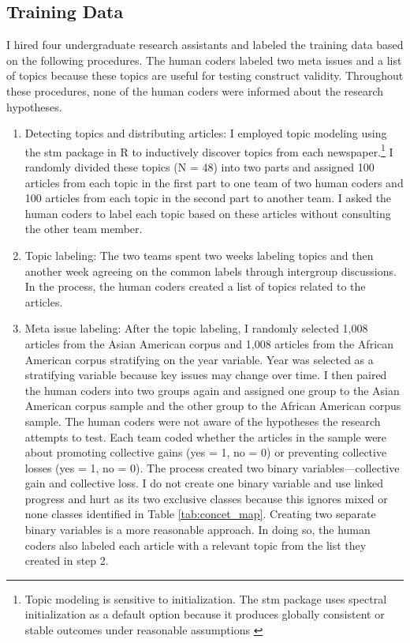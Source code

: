 \documentclass[12 pt]{article}
\begin{document}
\subsection{Training Data}
I hired four undergraduate research assistants and labeled the training data based on the following procedures. The human coders labeled two meta issues and a list of topics because these topics are useful for testing construct validity. Throughout these procedures, none of the human coders were informed about the research hypotheses.

\begin{enumerate}
    \item Detecting topics and distributing articles: I employed topic modeling using the stm package in R \parencite{roberts2014structural} to inductively discover topics from each newspaper.\footnote{Topic modeling is sensitive to initialization. The stm package uses spectral initialization as a default option because it produces globally consistent or stable outcomes under reasonable assumptions \citep[10]{roberts2014structural}} I randomly divided these topics (N = 48) into two parts and assigned 100 articles from each topic in the first part to one team of two human coders and 100 articles from each topic in the second part to another team. I asked the human coders to label each topic based on these articles without consulting the other team member. 
    \item Topic labeling: The two teams spent two weeks labeling topics and then another week agreeing on the common labels through intergroup discussions. In the process, the human coders created a list of topics related to the articles. 
    \item Meta issue labeling: After the topic labeling, I randomly selected 1,008 articles from the Asian American corpus and 1,008 articles from the African American corpus stratifying on the year variable. Year was selected as a stratifying variable because key issues may change over time. I then paired the human coders into two groups again and assigned one group to the Asian American corpus sample and the other group to the African American corpus sample. The human coders were not aware of the hypotheses the research attempts to test. Each team coded whether the articles in the sample were about promoting collective gains (yes = 1, no = 0) or preventing collective losses (yes = 1, no = 0). The process created two binary variables---collective gain and collective loss. I do not create one binary variable and use linked progress and hurt as its two exclusive classes because this ignores mixed or none classes identified in Table \ref{tab:concet_map}. Creating two separate binary variables is a more reasonable approach. In doing so, the human coders also labeled each article with a relevant topic from the list they created in step 2.
\end{enumerate}
\end{document}
